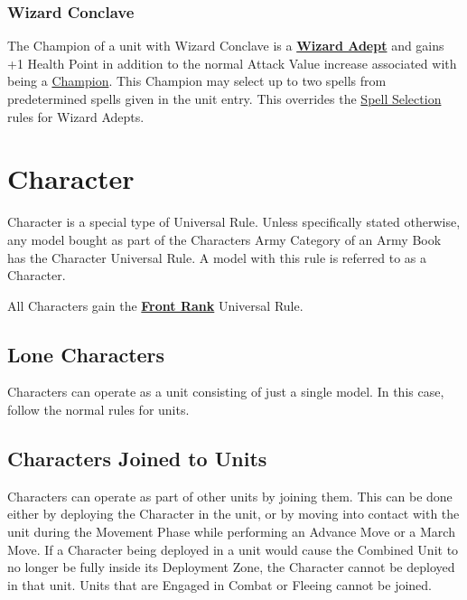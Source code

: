 \subsubsection{Wizard Conclave}
\idx[main=y]{\wizardconclave}\label{wizard_conclave}

The Champion of a unit with Wizard Conclave is a \hyperref[wizard_adept]{\textbf{Wizard Adept}} and gains +1 Health Point in addition to the normal Attack Value increase associated with being a \hyperref[champion]{Champion}. This Champion may select up to two spells from predetermined spells given in the unit entry. This overrides the \hyperref[spell_selection]{Spell Selection} rules for Wizard Adepts.

\columnbreak

\section{Character}
\label{characters}

Character is a special type of Universal Rule. Unless specifically stated otherwise, any model bought as part of the Characters Army Category of an Army Book has the Character Universal Rule. A model with this rule is referred to as a Character.

All Characters gain the \hyperref[front_rank]{\textbf{Front Rank}} Universal Rule.

\subsection{Lone Characters}

Characters can operate as a unit consisting of just a single model. In this case, follow the normal rules for units.

\subsection{Characters Joined to Units}

Characters can operate as part of other units by joining them. This can be done either by deploying the Character in the unit, or by moving into contact with the unit during the Movement Phase while performing an Advance Move or a March Move. If a Character being deployed in a unit would cause the Combined Unit to no longer be fully inside its Deployment Zone, the Character cannot be deployed in that unit. Units that are Engaged in Combat or Fleeing cannot be joined.

